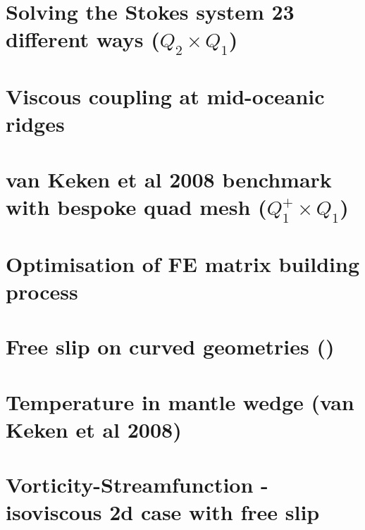 \documentclass[a4paper,11pt]{report}
\begin{document}
\chapter{Solving the Stokes system 23 different ways ($Q_2\times Q_1$)} %

\chapter{Viscous coupling at mid-oceanic ridges \label{f148}} %

\chapter{van Keken et al 2008 benchmark with bespoke quad mesh ($Q_1^+\times Q_1$) \label{f149}} %

\chapter{Optimisation of FE matrix building process \label{f150}} %

\chapter{Free slip on curved geometries (\QtwoQone)\label{f151}} %

\chapter{Temperature in mantle wedge (van Keken et al 2008) \label{f152}} %

\chapter{Vorticity-Streamfunction - isoviscous 2d case with free slip\label{f153}} %
\end{document}
